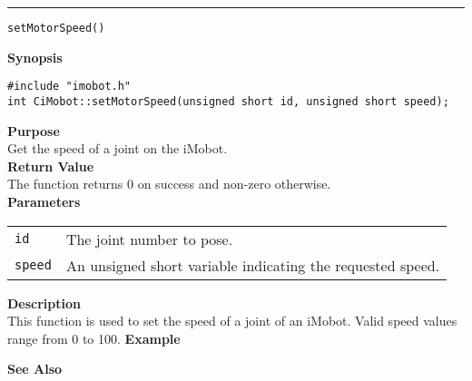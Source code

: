 \noindent
\vspace{5pt}
\rule{6.5in}{0.015in}
\noindent
{\LARGE \texttt{setMotorSpeed()}}\\
{}

\noindent
{\bf Synopsis}\\
\begin{verbatim}
#include "imobot.h"
int CiMobot::setMotorSpeed(unsigned short id, unsigned short speed);
\end{verbatim}

\noindent
{\bf Purpose}\\
Get the speed of a joint on the iMobot.\\

\noindent
{\bf Return Value}\\
The function returns 0 on success and non-zero otherwise.\\

\noindent
{\bf Parameters}
\vspace{-0.1in}
\begin{description}
\item               
\begin{tabular}{p{10 mm}p{145 mm}}
\texttt{id} & The joint number to pose. \\
\texttt{speed} & An unsigned short variable indicating the requested speed.
\end{tabular}
\end{description}

\noindent
{\bf Description}\\
This function is used to set the speed of a joint of an iMobot. Valid speed
values range from 0 to 100.
\noindent
{\bf Example}\\
\noindent

\noindent
{\bf See Also}\\

